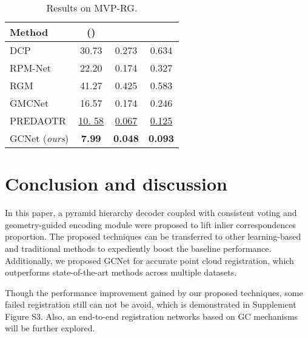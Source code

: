 \documentclass[10pt,twocolumn,letterpaper]{article}
\begin{document}
\begin{table}[h!]
\setlength{\tabcolsep}{7pt}
\centering\small
\vspace{-.5em}
\begin{tabular}{l|ccc}
\toprule
Method &  ()   &  &  \\
\midrule
DCP\cite{wang2019deep} & 30.73 & 0.273 & 0.634 \\
RPM-Net\cite{yew2020rpm} & 22.20 & 0.174 & 0.327 \\
RGM\cite{fu2021robust} & 41.27 & 0.425 & 0.583 \\
GMCNet\cite{pan2021robust} & 16.57 & 0.174 & 0.246 \\
\midrule
PREDAOTR\cite{huang2021predator} & \underline{10. 58} & \underline{0.067} & \underline{0.125} \\
\midrule
GCNet ({\em ours}) & {\bf 7.99} & {\bf 0.048} & {\bf 0.093} \\
\bottomrule
\end{tabular}
\vspace{-.5em}
\caption{Results on MVP-RG.}
\vspace{-1.25em}
\label{tab:mvp_rg}
\end{table}

\vspace{-.5em}
\section{Conclusion and discussion}

In this paper, a pyramid hierarchy decoder coupled with consistent voting and geometry-guided encoding module were proposed to lift inlier correspondences proportion. The proposed techniques can be transferred to other learning-based and traditional methods to expediently boost the baseline performance. Additionally, we proposed GCNet for accurate point cloud registration, which outperforms state-of-the-art methods across multiple datasets.

Though the performance improvement gained by our proposed techniques, some failed registration still can not be avoid, which is demonstrated in Supplement Figure S3. 
Also, an end-to-end registration networks based on GC mechanisms will be further explored.

{\small


}
\end{document}
